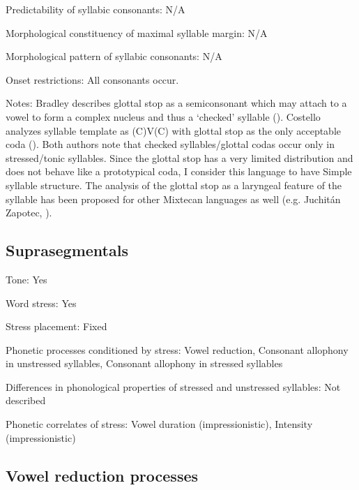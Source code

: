{\begin{appendixdesc}
\item[Predictability of syllabic consonants:] N/A

\item[Morphological constituency of maximal syllable margin:] N/A

\item[Morphological pattern of syllabic consonants:] N/A

\item[Onset restrictions:] All consonants occur.

\item[Notes:] Bradley describes glottal stop as a semiconsonant which may attach to a vowel to form a complex nucleus and thus a ‘checked’ syllable (\citeyear[14]{Bradley1970}). Costello analyzes syllable template as (C)V(C) with glottal stop as the only acceptable coda (\citeyear[24--25]{Costello2014}). Both authors note that checked syllables/glottal codas occur only in stressed/tonic syllables. Since the glottal stop has a very limited distribution and does not behave like a prototypical coda, I consider this language to have Simple syllable structure. The analysis of the glottal stop as a laryngeal feature of the syllable has been proposed for other Mixtecan languages as well (e.g. Juchitán Zapotec, \citealt{MarlettPickett1987}).
\end{appendixdesc}
\subsection*{Suprasegmentals}
\begin{appendixdesc}
\item[Tone:] Yes

\item[Word stress:] Yes

\item[Stress placement:] Fixed

\item[Phonetic processes conditioned by stress:] Vowel reduction, Consonant allophony in unstressed syllables, Consonant allophony in stressed syllables

\item[Differences in phonological properties of stressed and unstressed syllables:] Not described

\item[Phonetic correlates of stress:] Vowel duration (impressionistic), Intensity (impressionistic)
\end{appendixdesc}
\subsection*{Vowel reduction processes}
\begin{appendixdesc}


\end{appendixdesc}}
